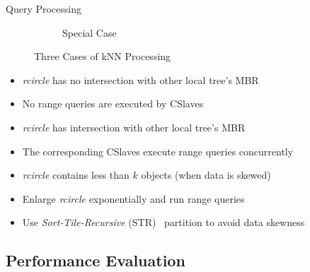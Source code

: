 \documentclass[xcolor={dvipsnames},aspectratio=169,10pt]{beamer}
\begin{document}
\begin{frame}{Query Processing}
\begin{figure}
\begin{subfigure}[b]{.313\linewidth}
      \caption{Special Case}
    \end{subfigure}
    \caption{Three Cases of {kNN} Processing}
  \end{figure}
  \vspace{-2ex}
  \small
  \begin{description}[<+->]
    \item[Case 1]
      \begin{itemize}[<1->]
        \item \emph{rcircle} has no intersection with other local tree's MBR
        \item No range queries are executed by CSlaves
      \end{itemize}
    \item[Case 2]
      \begin{itemize}[<1->]
        \item \emph{rcircle} has intersection with other local tree's MBR
        \item The corresponding CSlaves execute range queries \alert{concurrently}
      \end{itemize}
    \item[Special Case]
      \begin{itemize}[<1->]
        \item \emph{rcircle} contains less than $k$ objects (when data is skewed)
        \item Enlarge \emph{rcircle} exponentially and run range queries
        \item Use \alert{\emph{Sort-Tile-Recursive} (STR)}~\cite{10.1109/ICDE.1997.582015} partition to avoid data skewness
      \end{itemize}
  \end{description}
\end{frame}

\subsection{Performance Evaluation}
\end{document}
